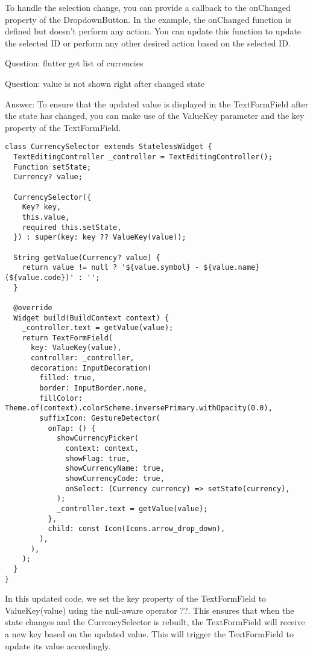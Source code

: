 To handle the selection change, you can provide a callback to the onChanged property of the DropdownButton. 
In the example, the onChanged function is defined but doesn't perform any action. You can update this function 
to update the selected ID or perform any other desired action based on the selected ID.

Question: flutter get list of currencies

Question: value is not shown right after changed state

Answer: To ensure that the updated value is displayed in the TextFormField after the state has changed, you can make 
use of the ValueKey parameter and the key property of the TextFormField.

\begin{lstlisting}
class CurrencySelector extends StatelessWidget {
  TextEditingController _controller = TextEditingController();
  Function setState;
  Currency? value;

  CurrencySelector({
    Key? key,
    this.value,
    required this.setState,
  }) : super(key: key ?? ValueKey(value));

  String getValue(Currency? value) {
    return value != null ? '${value.symbol} - ${value.name} (${value.code})' : '';
  }

  @override
  Widget build(BuildContext context) {
    _controller.text = getValue(value);
    return TextFormField(
      key: ValueKey(value),
      controller: _controller,
      decoration: InputDecoration(
        filled: true,
        border: InputBorder.none,
        fillColor: Theme.of(context).colorScheme.inversePrimary.withOpacity(0.0),
        suffixIcon: GestureDetector(
          onTap: () {
            showCurrencyPicker(
              context: context,
              showFlag: true,
              showCurrencyName: true,
              showCurrencyCode: true,
              onSelect: (Currency currency) => setState(currency),
            );
            _controller.text = getValue(value);
          },
          child: const Icon(Icons.arrow_drop_down),
        ),
      ),
    );
  }
}
\end{lstlisting}

In this updated code, we set the key property of the TextFormField to ValueKey(value) using the null-aware operator ??. 
This ensures that when the state changes and the CurrencySelector is rebuilt, the TextFormField will receive a 
new key based on the updated value. This will trigger the TextFormField to update its value accordingly.

